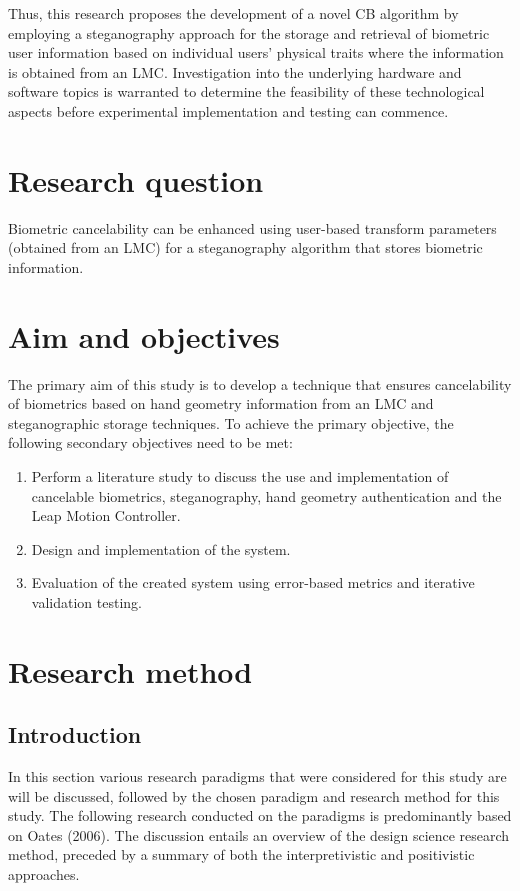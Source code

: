 Thus, this research proposes the development of a novel CB algorithm by employing a steganography approach for the storage and retrieval of biometric user information based on individual users’ physical traits where the information is obtained from an LMC. Investigation into the underlying hardware and software topics is warranted to determine the feasibility of these technological aspects before experimental implementation and testing can commence.


\section{Research question}  %
\label{section1.3}

Biometric cancelability can be enhanced using user-based transform parameters (obtained from an LMC) for a steganography algorithm that stores biometric information.


\section{Aim and objectives}  %
\label{section1.4}
The primary aim of this study is to develop a technique that ensures cancelability of biometrics based on hand geometry information from an LMC and steganographic storage techniques.
To achieve the primary objective, the following secondary objectives need to be met:

\begin{enumerate}[label=\roman*.]
\item Perform a literature study to discuss the use and implementation of cancelable biometrics, steganography, hand geometry authentication and the Leap Motion Controller.
\item Design and implementation of the system.
\item Evaluation of the created system using error-based metrics and iterative validation testing.
\end{enumerate}

\section{Research method}  %
\subsection{Introduction}
In this section various research paradigms that were considered for this study are will be discussed, followed by the chosen paradigm and research method for this study. The following research conducted on the paradigms is predominantly based on Oates (2006). The discussion entails an overview of the design science research method, preceded by a summary of both the interpretivistic and positivistic approaches.

